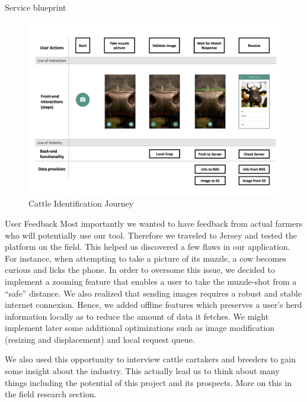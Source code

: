 \begin{subsection}{Service blueprint}
\begin{figure}
  \end{figure}
  \begin{figure}
    \includegraphics[width=\textwidth]{images/identify-cattle-journey.png}
    \caption{Cattle Identification Journey}
    \label{fig:identify-cattle-journey}
  \end{figure}
\end{subsection}


\begin{subsection}{User Feedback}
  Most importantly we wanted to have feedback from actual farmers who will potentially use our tool. Therefore we traveled to Jersey and tested the platform on the field. This helped us discovered a few flaws in our application. For instance, when attempting to take a picture of its muzzle, a cow becomes curious and licks the phone. In order to oversome this issue, we decided to implement a zooming feature that enables a user to take the muzzle-shot from a ``safe'' distance. We also realized that sending images requires a robust and stable internet connexion. Hence, we added offline features which preserves a user's herd information locally as to reduce the amount of data it fetches. We might implement later some additional optimizations such as image modification (resizing and displacement) and local request queue.
  
  We also used this opportunity to interview cattle cartakers and breeders to gain some insight about the industry. This actually lead us to think about many things including the potential of this project and its prospects. More on this in the field research section.
\end{subsection}

